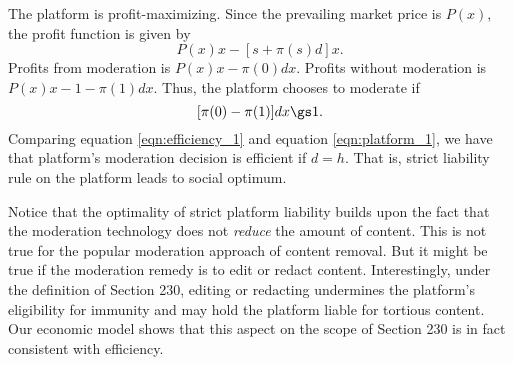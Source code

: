 The platform is profit-maximizing. Since the prevailing market price is $P(x)$, the profit function is given by 
\begin{equation}
    P(x)x-[s+\pi(s)d]x.
\end{equation}
Profits from moderation is $P(x)x-\pi(0)dx$. Profits without moderation is $P(x)x-1-\pi(1)dx$. Thus, the platform chooses to moderate if 
\begin{equation}\label{eqn:platform_1}
    [\pi(0)-\pi(1)]dx\gs 1.
\end{equation}
Comparing equation \ref{eqn:efficiency_1} and equation \ref{eqn:platform_1}, we have that platform's moderation decision is efficient if $d=h$. That is, strict liability rule on the platform leads to social optimum. 

Notice that the optimality of strict platform liability builds upon the fact that the moderation technology does not \emph{reduce} the amount of content. This is not true for the popular moderation approach of content removal. But it might be true if the moderation remedy is to edit or redact content. Interestingly, under the definition of Section 230, editing or redacting undermines the platform's eligibility for immunity and may hold the platform liable for tortious content. Our economic model shows that this aspect on the scope of Section 230 is in fact consistent with efficiency.










